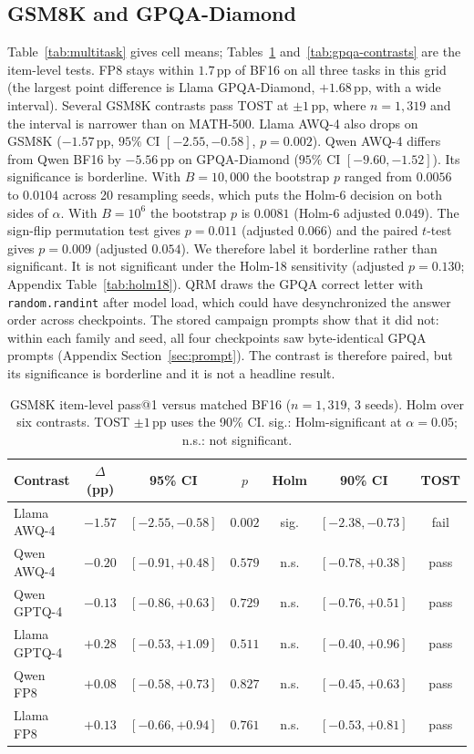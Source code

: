 \documentclass[11pt,a4paper]{article}
\begin{document}
\subsection{GSM8K and GPQA-Diamond}
Table~\ref{tab:multitask} gives cell means; Tables~\ref{tab:gsm-contrasts} and~\ref{tab:gpqa-contrasts} are the item-level tests. FP8 stays within $1.7$\,pp of BF16 on all three tasks in this grid (the largest point difference is Llama GPQA-Diamond, $+1.68$\,pp, with a wide interval). Several GSM8K contrasts pass TOST at $\pm 1$\,pp, where $n=1{,}319$ and the interval is narrower than on MATH-500. Llama AWQ-4 also drops on GSM8K ($-1.57$\,pp, $95\%$ CI $[-2.55,-0.58]$, $p=0.002$). Qwen AWQ-4 differs from Qwen BF16 by $-5.56$\,pp on GPQA-Diamond ($95\%$ CI $[-9.60,-1.52]$). Its significance is borderline. With $B=10{,}000$ the bootstrap $p$ ranged from $0.0056$ to $0.0104$ across 20 resampling seeds, which puts the Holm-6 decision on both sides of $\alpha$. With $B=10^6$ the bootstrap $p$ is $0.0081$ (Holm-6 adjusted $0.049$). The sign-flip permutation test gives $p=0.011$ (adjusted $0.066$) and the paired $t$-test gives $p=0.009$ (adjusted $0.054$). We therefore label it borderline rather than significant. It is not significant under the Holm-18 sensitivity (adjusted $p=0.130$; Appendix Table~\ref{tab:holm18}). QRM draws the GPQA correct letter with \texttt{random.randint} after model load, which could have desynchronized the answer order across checkpoints. The stored campaign prompts show that it did not: within each family and seed, all four checkpoints saw byte-identical GPQA prompts (Appendix Section~\ref{sec:prompt}). The contrast is therefore paired, but its significance is borderline and it is not a headline result.

\begin{table}[t]
\centering
\caption{GSM8K item-level pass@1 versus matched BF16 ($n=1{,}319$, 3 seeds). Holm over six contrasts. TOST $\pm 1$\,pp uses the 90\% CI. sig.: Holm-significant at $\alpha=0.05$; n.s.: not significant.}
\label{tab:gsm-contrasts}
\small
\begin{tabular}{lcccccc}
\toprule
\textbf{Contrast} & $\Delta$ (pp) & \textbf{95\% CI} & $p$ & \textbf{Holm} & \textbf{90\% CI} & \textbf{TOST} \\
\midrule
Llama AWQ-4  & $-1.57$ & $[-2.55,-0.58]$ & $0.002$ & sig. & $[-2.38,-0.73]$ & fail \\
Qwen AWQ-4   & $-0.20$ & $[-0.91,+0.48]$ & $0.579$ & n.s. & $[-0.78,+0.38]$ & pass \\
Qwen GPTQ-4  & $-0.13$ & $[-0.86,+0.63]$ & $0.729$ & n.s. & $[-0.76,+0.51]$ & pass \\
Llama GPTQ-4 & $+0.28$ & $[-0.53,+1.09]$ & $0.511$ & n.s. & $[-0.40,+0.96]$ & pass \\
Qwen FP8     & $+0.08$ & $[-0.58,+0.73]$ & $0.827$ & n.s. & $[-0.45,+0.63]$ & pass \\
Llama FP8    & $+0.13$ & $[-0.66,+0.94]$ & $0.761$ & n.s. & $[-0.53,+0.81]$ & pass \\
\bottomrule
\end{tabular}
\end{table}
\end{document}
